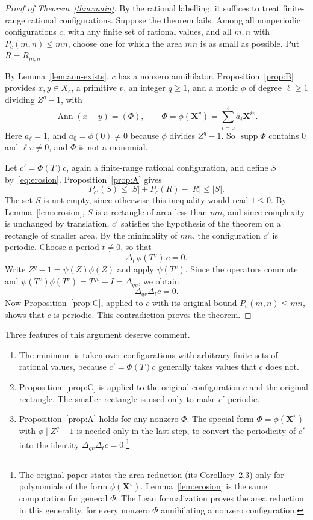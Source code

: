 \documentclass[11pt,a4paper,reqno]{amsart}
\theoremstyle{definition}
\theoremstyle{remark}
\newcommand{\mon}[1]{\boldsymbol X^{#1}}
\newcommand{\De}{\Delta}
\DeclareMathOperator{\Ann}{Ann}
\DeclareMathOperator{\supp}{supp}
\numberwithin{equation}{section}
\begin{document}
\begin{proof}[Proof of Theorem~\ref{thm:main}]
By the rational labelling, it suffices to treat finite-range rational configurations. Suppose the theorem fails. Among all nonperiodic configurations $c$, with any finite set of rational values, and all $m,n$ with $P_c(m,n)\le mn$, choose one for which the area $mn$ is as small as possible. Put $R=R_{m,n}$.

By Lemma~\ref{lem:ann-exists}, $c$ has a nonzero annihilator. Proposition~\ref{prop:B} provides $x,y\in X_c$, a primitive $v$, an integer $q\ge1$, and a monic $\phi$ of degree $\ell\ge1$ dividing $Z^q-1$, with
\[
 \Ann(x-y)=(\Phi),\qquad \Phi=\phi(\mon v)=\sum_{i=0}^{\ell}a_i\mon{iv}.
\]
Here $a_\ell=1$, and $a_0=\phi(0)\ne0$ because $\phi$ divides $Z^q-1$. So $\supp\Phi$ contains $0$ and $\ell v\ne0$, and $\Phi$ is not a monomial.

Let $c'=\Phi(T)c$, again a finite-range rational configuration, and define $S$ by~\eqref{eq:erosion}. Proposition~\ref{prop:A} gives
\[
 P_{c'}(S)\le|S|+P_c(R)-|R|\le|S|.
\]
The set $S$ is not empty, since otherwise this inequality would read $1\le0$. By Lemma~\ref{lem:erosion}, $S$ is a rectangle of area less than $mn$, and since complexity is unchanged by translation, $c'$ satisfies the hypothesis of the theorem on a rectangle of smaller area. By the minimality of $mn$, the configuration $c'$ is periodic. Choose a period $t\ne0$, so that
\[
 \De_t\,\phi(T^v)\,c=0.
\]
Write $Z^q-1=\psi(Z)\phi(Z)$ and apply $\psi(T^v)$. Since the operators commute and $\psi(T^v)\phi(T^v)=T^{qv}-I=\De_{qv}$, we obtain
\[
 \De_{qv}\De_tc=0.
\]
Now Proposition~\ref{prop:C}, applied to $c$ with its original bound $P_c(m,n)\le mn$, shows that $c$ is periodic. This contradiction proves the theorem.
\end{proof}

Three features of this argument deserve comment.
\begin{enumerate}
\item The minimum is taken over configurations with arbitrary finite sets of rational values, because $c'=\Phi(T)c$ generally takes values that $c$ does not.
\item Proposition~\ref{prop:C} is applied to the original configuration $c$ and the original rectangle. The smaller rectangle is used only to make $c'$ periodic.
\item Proposition~\ref{prop:A} holds for any nonzero $\Phi$. The special form $\Phi=\phi(\mon v)$ with $\phi\mid Z^q-1$ is needed only in the last step, to convert the periodicity of $c'$ into the identity $\De_{qv}\De_tc=0$.\footnote{The original paper states the area reduction (its Corollary~2.3) only for polynomials of the form $\phi(\mon v)$. Lemma~\ref{lem:erosion} is the same computation for general $\Phi$. The Lean formalization proves the area reduction in this generality, for every nonzero $\Phi$ annihilating a nonzero configuration.}
\end{enumerate}
\end{document}

